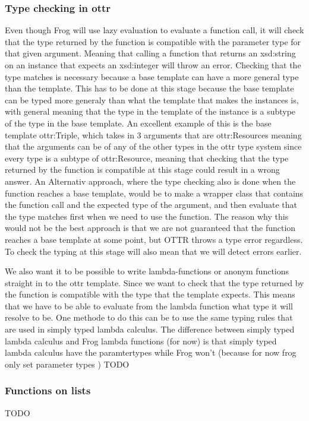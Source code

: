 \subsubsection{Type checking in ottr}
Even though Frog will use lazy evaluation to evaluate a function call, it will check that the type returned by the function is compatible with the parameter type for that given argument. Meaning that calling a function that returns an xsd:string on an instance that expects an xsd:integer will throw an error. Checking that the type matches is necessary because a base template can have a more general type than the template.  This has to be done at this stage because the base template can be typed more generaly than what the template that makes the instances is, with general meaning that the type in the template of the instance is a subtype of the type in the base template. An excellent example of this is the base template ottr:Triple, which takes in 3 arguments that are ottr:Resources meaning that the arguments can be of any of the other types in the ottr type system since every type is a subtype of ottr:Resource, meaning that checking that the type returned by the function is compatible at this stage could result in a wrong answer. An Alternativ approach, where the type checking also is done when the function reaches a base template, would be to make a wrapper class that contains the function call and the expected type of the argument, and then evaluate that the type matches first when we need to use the function. The reason why this would not be the best approach is that we are not guaranteed that the function reaches a base template at some point, but OTTR throws a type error regardless. To check the typing at this stage will also mean that we will detect errors earlier.

\para
We also want it to be possible to write lambda-functions or anonym functions straight in to the ottr template. Since we want to check that 
the type returned by the function is compatible with the type that the template expects. This means that we have to be able to evaluate from 
the lambda function what type it will resolve to be. One methode to do this can be to use the same typing rules that are used in 
simply typed lambda calculus. The difference between simply typed lambda calculus and Frog lambda functions (for now) is that simply typed 
lambda calculus have the paramtertypes while Frog won't (because for now frog only set parameter types )  TODO

\subsubsection{Functions on lists}
TODO

